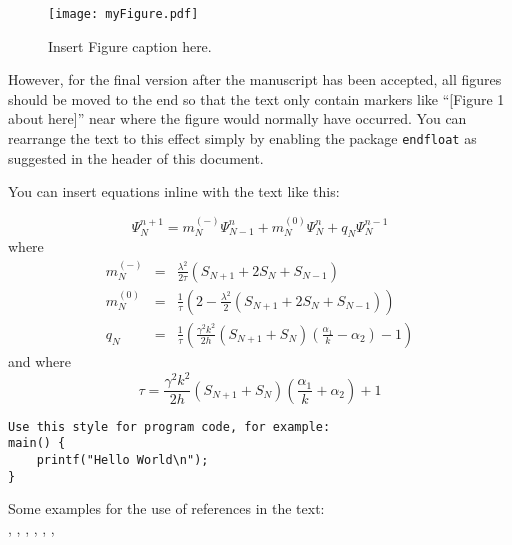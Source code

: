 \documentclass[letterpaper, 12pt]{article}
\begin{document}
\begin{figure}[htpb]
\begin{center}
\texttt{[image: myFigure.pdf]}
\caption{Insert Figure caption here.}
\label{fig:myFigure}
\end{center}
\end{figure}

However, for the final version after the manuscript has been accepted, all figures should be moved to the end so that the text only contain markers like ``[Figure 1 about here]'' near where the figure would normally have occurred. You can rearrange the text to this effect simply by enabling the package {\tt endfloat} as suggested in the header of this document.


You can insert equations inline with the text like this:

\begin{equation}
	\label{radupdate}
		\Psi_{N}^{n+1} = m_{N}^{(-)}\Psi_{N-1}^{n}+m_{N}^{(0)}\Psi_{N}^{n} + q_{N}\Psi_{N}^{n-1}
\end{equation}
where
\begin{eqnarray*}
	m_{N}^{(-)} &=& \frac{\lambda^2}{2\tau}\left(S_{N+1}+2S_{N}+S_{N-1}\right)\\
	m_{N}^{(0)} &=& \frac{1}{\tau}\left(2-\frac{\lambda^2}{2}\left(S_{N+1}+2S_{N}+S_{N-1}\right)\right)\\
	q_{N} &=& \frac{1}{\tau}\left(\frac{\gamma^2 k^2}{2h}\left(S_{N+1}+S_{N}\right)\left(\frac{\alpha_{1}}{k}-	\alpha_{2}\right)-1\right)
\end{eqnarray*}
and where 
\begin{equation*}
	\tau = \frac{\gamma^2 k^2}{2h}\left(S_{N+1}+S_{N}\right)\left(\frac{\alpha_{1}}{k}+\alpha_{2}\right)+1
\end{equation*}

%
\begin{Verbatim}[fontfamily=courier, xleftmargin=\parindent]
Use this style for program code, for example:
main() {
    printf("Hello World\n");    
}
\end{Verbatim}

Some examples for the use of references in the text:\\
\cite{Ano08}, \cite{Bele68}, \cite{Ther99}, \cite{Zica02},
\cite*{VeRo00}, \cite*{AtDa04}, 
\citep*{AtDa04} 




\end{document}
